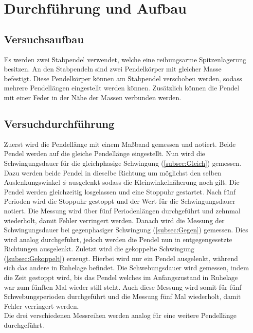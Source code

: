\section{Durchführung und Aufbau}
\label{sec:Durchführung}
\subsection{Versuchsaufbau} %
\label{sub:Versuchsaufbau}
Es werden zwei Stabpendel verwendet, welche eine reibungsarme Spitzenlagerung besitzen.
An den Stabpendeln sind zwei Pendelkörper mit gleicher Masse befestigt.
Diese Pendelkörper können am Stabpendel verschoben werden, sodass mehrere Pendellängen eingestellt werden können.
Zusätzlich können die Pendel mit einer Feder in der Nähe der Massen verbunden werden.

\subsection{Versuchdurchführung} %
\label{sub:Versuchdurchführung}
Zuerst wird die Pendellänge mit einem Maßband gemessen und notiert. Beide Pendel werden auf die gleiche Pendellänge eingestellt.
Nun wird die Schwingungsdauer für die gleichphasige Schwingung (\autoref{subsec:Gleich}) gemessen. Dazu werden beide Pendel in dieselbe Richtung
um möglichst den selben Auslenkungswinkel $\phi$ ausgelenkt sodass die Kleinwinkelnäherung noch gilt. Die Pendel werden gleichzeitig losgelassen und
eine Stoppuhr gestartet. Nach fünf Perioden wird die Stoppuhr gestoppt und der Wert für die Schwingungsdauer notiert. 
Die Messung wird über fünf Periodenlängen durchgeführt und zehnmal wiederholt, damit Fehler verringert werden.
Danach wird die Messung der Schwingungsdauer bei gegenphasiger Schwingung (\autoref{subsec:Gegen}) gemessen.
Dies wird analog durchgeführt, jedoch werden die Pendel nun in entgegengesetzte Richtungen ausgelenkt.
Zuletzt wird die gekoppelte Schwingung (\autoref{subsec:Gekoppelt}) erzeugt.
Hierbei wird nur ein Pendel ausgelenkt, während sich das andere in Ruhelage befindet.
Die Schwebungsdauer wird gemessen, indem die Zeit gestoppt wird, bis das Pendel welches im Anfangszustand in Ruhelage war zum fünften Mal wieder still steht. 
Auch diese Messung wird somit für fünf Schwebungsperioden durchgeführt und die Messung fünf Mal wiederholt, damit Fehler verringert werden. \\
Die drei verschiedenen Messreihen werden analog für eine weitere Pendellänge durchgeführt.


